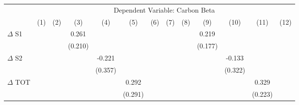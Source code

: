 {
\def\sym#1{\ifmmode^{#1}\else\(^{#1}\)\fi}
\begin{tabular}{l*{12}{c}}
\hline\hline
                    &\multicolumn{12}{c}{Dependent Variable: Carbon Beta}                                                                                                                                                                                                                   \\\cmidrule(lr){2-13}
                    &\multicolumn{1}{c}{(1)}         &\multicolumn{1}{c}{(2)}         &\multicolumn{1}{c}{(3)}         &\multicolumn{1}{c}{(4)}         &\multicolumn{1}{c}{(5)}         &\multicolumn{1}{c}{(6)}         &\multicolumn{1}{c}{(7)}         &\multicolumn{1}{c}{(8)}         &\multicolumn{1}{c}{(9)}         &\multicolumn{1}{c}{(10)}         &\multicolumn{1}{c}{(11)}         &\multicolumn{1}{c}{(12)}         \\
\hline
$\Delta$ S1         &                     &                     &       0.261         &                     &                     &                     &                     &                     &       0.219         &                     &                     &                     \\
                    &                     &                     &     (0.210)         &                     &                     &                     &                     &                     &     (0.177)         &                     &                     &                     \\
$\Delta$ S2         &                     &                     &                     &      -0.221         &                     &                     &                     &                     &                     &      -0.133         &                     &                     \\
                    &                     &                     &                     &     (0.357)         &                     &                     &                     &                     &                     &     (0.322)         &                     &                     \\
$\Delta$ TOT        &                     &                     &                     &                     &       0.292         &                     &                     &                     &                     &                     &       0.329         &                     \\
                    &                     &                     &                     &                     &     (0.291)         &                     &                     &                     &                     &                     &     (0.223)         &                     \\

\end{tabular}}
